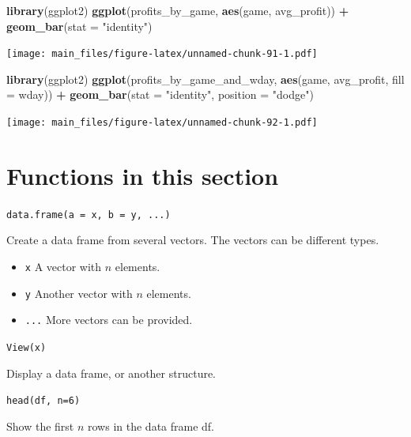 \documentclass[
]{book}
\newenvironment{Shaded}{\begin{snugshade}}{\end{snugshade}}
\newcommand{\AttributeTok}[1]{\textcolor[rgb]{0.13,0.29,0.53}{#1}}
\newcommand{\FunctionTok}[1]{\textcolor[rgb]{0.13,0.29,0.53}{\textbf{#1}}}
\newcommand{\NormalTok}[1]{#1}
\newcommand{\SpecialCharTok}[1]{\textcolor[rgb]{0.81,0.36,0.00}{\textbf{#1}}}
\newcommand{\StringTok}[1]{\textcolor[rgb]{0.31,0.60,0.02}{#1}}
\providecommand{\tightlist}{%
  \setlength{\itemsep}{0pt}\setlength{\parskip}{0pt}}
\begin{document}
\begin{Shaded}
\begin{Highlighting}[]
\FunctionTok{library}\NormalTok{(ggplot2)}
\FunctionTok{ggplot}\NormalTok{(profits\_by\_game, }\FunctionTok{aes}\NormalTok{(game, avg\_profit)) }\SpecialCharTok{+} \FunctionTok{geom\_bar}\NormalTok{(}\AttributeTok{stat =} \StringTok{"identity"}\NormalTok{)}
\end{Highlighting}
\end{Shaded}

\texttt{[image: main\_files/figure-latex/unnamed-chunk-91-1.pdf]}

\begin{Shaded}
\begin{Highlighting}[]
\FunctionTok{library}\NormalTok{(ggplot2)}
\FunctionTok{ggplot}\NormalTok{(profits\_by\_game\_and\_wday, }\FunctionTok{aes}\NormalTok{(game, avg\_profit, }\AttributeTok{fill =}\NormalTok{ wday)) }\SpecialCharTok{+} \FunctionTok{geom\_bar}\NormalTok{(}\AttributeTok{stat =} \StringTok{"identity"}\NormalTok{, }\AttributeTok{position =} \StringTok{"dodge"}\NormalTok{)}
\end{Highlighting}
\end{Shaded}

\texttt{[image: main\_files/figure-latex/unnamed-chunk-92-1.pdf]}

\hypertarget{functions-in-this-section}{%
\section{Functions in this section}\label{functions-in-this-section}}

\texttt{data.frame(a\ =\ x,\ b\ =\ y,\ ...)}

Create a data frame from several vectors. The vectors can be different types.

\begin{itemize}
\tightlist
\item
  \texttt{x} A vector with \(n\) elements.
\item
  \texttt{y} Another vector with \(n\) elements.
\item
  \texttt{...} More vectors can be provided.
\end{itemize}

\texttt{View(x)}

Display a data frame, or another structure.

\texttt{head(df,\ n=6)}

Show the first \(n\) rows in the data frame df.
\end{document}
